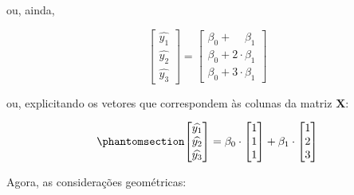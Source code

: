 \documentclass[
  letterpaper,
  DIV=11,
  numbers=noendperiod]{scrreprt}
\begin{document}
ou, ainda,

\[
\begin{bmatrix}
  \widehat{y_1} \\ \widehat{y_2} \\ \widehat{y_3}
\end{bmatrix}
=
\begin{bmatrix}
  \beta_0 + \phantom{1\cdot{}}\beta_1 \\
  \beta_0 + 2\cdot \beta_1 \\
  \beta_0 + 3\cdot \beta_1
\end{bmatrix}
\]

ou, explicitando os vetores que correspondem às colunas da matriz
$\mathbf{X}$:

\begin{equation}\phantomsection\label{eq-modelo}{
\begin{bmatrix}
  \widehat{y_1} \\ \widehat{y_2} \\ \widehat{y_3}
\end{bmatrix}
=
\beta_0 \cdot 
\begin{bmatrix}
  1 \\ 1 \\ 1
\end{bmatrix}
+ 
\beta_1 \cdot
\begin{bmatrix}
  1 \\ 2 \\ 3
\end{bmatrix}
}\end{equation}

Agora, as considerações geométricas:
\end{document}
